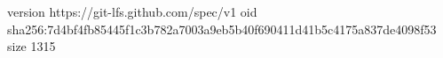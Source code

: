 version https://git-lfs.github.com/spec/v1
oid sha256:7d4bf4fb85445f1c3b782a7003a9eb5b40f690411d41b5c4175a837de4098f53
size 1315
